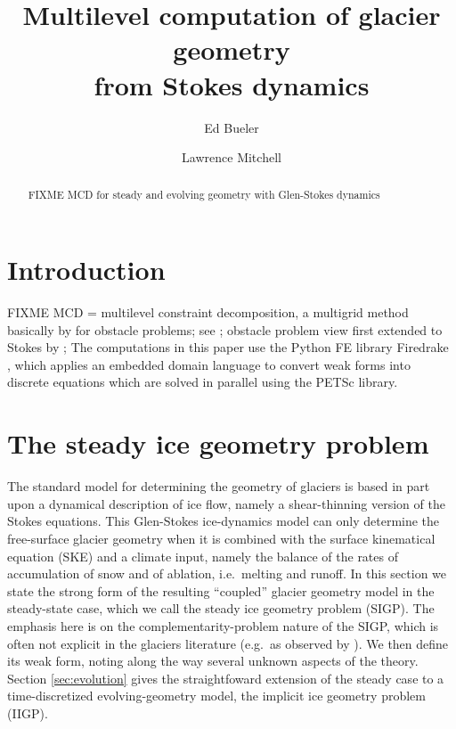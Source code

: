 \documentclass[letterpaper,final,12pt,reqno]{amsart}
\theoremstyle{claim}
\numberwithin{equation}{section}
\numberwithin{figure}{section}
\numberwithin{table}{section}
\numberwithin{theorem}{section}
\begin{document}
\title[Multilevel computation of glacier geometry from Stokes dynamics]{Multilevel computation of glacier geometry \\ from Stokes dynamics}

\author{Ed Bueler}

\author{Lawrence Mitchell}

\begin{abstract} FIXME MCD for steady and evolving geometry with Glen-Stokes dynamics
\end{abstract}

\maketitle


\thispagestyle{empty}

\section{Introduction} \label{sec:intro}

FIXME MCD = multilevel constraint decomposition, a multigrid \cite{Trottenbergetal2001} method basically by \cite{Tai2003} for obstacle problems; see \cite{Bueler2022};  obstacle problem view first extended to Stokes by \cite{WirbelJarosch2020};  The computations in this paper use the Python FE library Firedrake \cite{Rathgeberetal2016}, which applies an embedded domain language \cite{Alnaesetal2014} to convert weak forms into discrete equations which are solved in parallel using the PETSc \cite{Balayetal2020} library.


\section{The steady ice geometry problem} \label{sec:stokesgeometry}

The standard model for determining the geometry of glaciers is based in part upon a dynamical description of ice flow, namely a shear-thinning version of the Stokes equations.  This Glen-Stokes ice-dynamics model can only determine the free-surface glacier geometry when it is combined with the surface kinematical equation (SKE) and a climate input, namely the balance of the rates of accumulation of snow and of ablation, i.e.~melting and runoff.  In this section we state the strong form of the resulting ``coupled'' glacier geometry model in the steady-state case, which we call the steady ice geometry problem (SIGP).  The emphasis here is on the complementarity-problem nature of the SIGP, which is often not explicit in the glaciers literature (e.g.~as observed by \cite{SchoofHewitt2013}).  We then define its weak form, noting along the way several unknown aspects of the theory.  Section \ref{sec:evolution} gives the straightfoward extension of the steady case to a time-discretized evolving-geometry model, the implicit ice geometry problem (IIGP).
\end{document}
